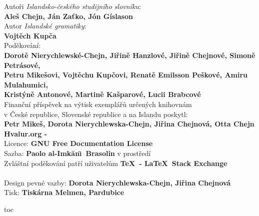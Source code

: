 \noindent%
Autoři \textit{Islandsko-českého studijního slovníku}:\\
  \textbf{Aleš Chejn, Ján Zaťko, Jón Gíslason}\\[\baselineskip]
Autor \textit{Islandské gramatiky}:\\
  \textbf{Vojtěch Kupča}\\[\baselineskip]
Poděkování:\\
  \textbf{Dorotě Nierychlewské-Chejn, Jiřině Hanzlové, Jiřině Chejnové,
          Simoně Petrásové,\\ Petru Mikešovi, Vojtěchu Kupčovi, 
          Renatě Emilsson Peškové, Amiru Mulahumici, \\ Kristýně Antonové, 
          Martině Kašparové, Lucii Brabcové}\\[\baselineskip]
Finanční příspěvek na výtisk exemplářů určených knihovnám\\ v České republice,
Slovenské republice a na Islandu poskytl:\\
  \textbf{Petr Mikeš, Dorota Nierychlewska-Chejn, Jiřina Chejnová, Otta Chejn}
  \\[34\baselineskip]
\textbf{Hvalur.org - \the\year}\\
Licence: \textbf{GNU Free Documentation License}\\
Sazba: \textbf{Paolo al-Imk\=an\=\i\ Brasolin} v prostředí  \textbf\XeLaTeX\\
  Zvláštní poděkování patří uživatelům
  \textbf{\TeX\ - \LaTeX\ Stack Exchange}\\[\baselineskip]
\textbf\ISBN\\[\baselineskip]
Design pevné vazby: \textbf{Dorota Nierychlewska-Chejn, Jiřina Chejnová}\\
Tisk: \textbf{Tiskárna Melmen, Pardubice}\\



\cleardoublepage


\pdfbookmark\contentsname{toc}    

\tableofcontents

\fi



